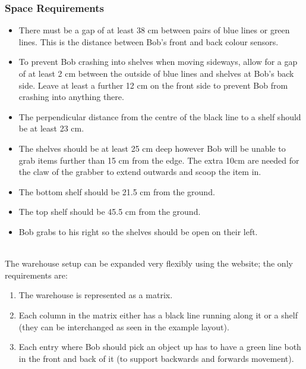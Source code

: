 \documentclass[onecolumn]{IEEEtran}
\begin{document}
\subsubsection{Space Requirements}
\begin{itemize}
    \item There must be a gap of at least 38 cm between pairs of blue lines or green lines. This is the distance between Bob’s front and back colour sensors.
    \item To prevent Bob crashing into shelves when moving sideways, allow for a gap of at least 2 cm between the outside of blue lines and shelves at Bob’s back side. Leave at least a further 12 cm on the front side to prevent Bob from crashing into anything there.
    \item The perpendicular distance from the centre of the black line to a shelf should be at least 23 cm.
    \item The shelves should be at least 25 cm deep however Bob will be unable to grab items further than 15 cm from the edge. The extra 10cm are needed for the claw of the grabber to extend outwards and scoop the item in.
    \item The bottom shelf should be 21.5 cm from the ground.
    \item The top shelf should be 45.5 cm from the ground.
    \item Bob grabs to his right so the shelves should be open on their left.
\end{itemize}
\  \\
The warehouse setup can be expanded very flexibly using the website; the only requirements are: 
\begin{enumerate}
    \item The warehouse is represented as a matrix.
    \item Each column in the matrix either has a black line running along it or a shelf (they can be interchanged as seen in the example layout).
    \item Each entry where Bob should pick an object up has to have a green line both in the front and back of it (to support backwards and forwards movement).
\end{enumerate}
\end{document}

